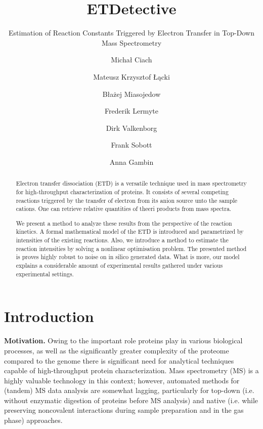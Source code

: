 \documentclass{llncs}
\begin{document}
\pagestyle{plain}
\title{ETDetective}
\subtitle{Estimation of Reaction Constants Triggered by Electron Transfer in Top-Down Mass Spectrometry}
\author{Michał Ciach \and Mateusz Krzysztof Łącki \and Błażej Miasojedow \and Frederik Lermyte \and Dirk Valkenborg \and Frank Sobott \and Anna Gambin }


\maketitle
\begin{abstract}
        Electron transfer dissociation (ETD) is a versatile technique used in mass spectrometry for high-throughput characterization of proteins. It consists of several competing reactions triggered by the transfer of electron from its anion source unto the sample cations. One can retrieve relative quantities of theeri products from mass spectra.

        We present a method to analyze these results from the perspective of the reaction kinetics. A formal mathematical model of the ETD is introduced and parametrized by intensities of the existing reactions. Also, we introduce a method to estimate the reaction intensities by solving a nonlinear optimisation problem. The presented method is proves highly robust to noise on in silico generated data. What is more, our model explains a considerable amount of experimental results gathered under various experimental settings.
\end{abstract}

\section{Introduction}
\textbf{Motivation.}
        Owing to the important role proteins play in various biological processes, as well as the significantly greater complexity of the proteome compared to the genome \cite{Smith2013-km} there is significant need for analytical techniques capable of high-throughput protein characterization. Mass spectrometry (MS) is a highly valuable technology in this context; however, automated methods for (tandem) MS data analysis are somewhat lagging, particularly for top-down (i.e. without enzymatic digestion of proteins before MS analysis) and native (i.e. while preserving noncovalent interactions during sample preparation and in the gas phase) approaches.
\end{document}
